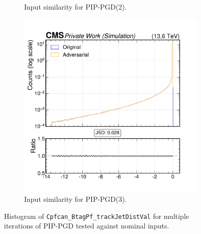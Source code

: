 \begin{figure}[htbp]
\begin{subfigure}[t]{0.32\textwidth}
    \caption*{Input similarity for PIP-PGD(2).}
  \end{subfigure}\hfill
  \begin{subfigure}[t]{0.32\textwidth}
    \includegraphics[width=\linewidth]{media/output/features/compare/combined_it_3/cmp_cpf_arr_Cpfcan_BtagPf_trackJetDistVal.pdf}
    \caption*{Input similarity for PIP-PGD(3).}
  \end{subfigure}

  \caption*{Histogram of \texttt{Cpfcan\_BtagPf\_trackJetDistVal} for multiple iterations of PIP-PGD tested against nominal inputs.}
  \label{fig:combined_input_Cpfcan_BtagPf_trackJetDistVal}
\end{figure}

